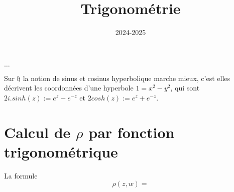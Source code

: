 \documentclass[a4paper,12pt]{article}
\title{Trigonométrie}
\date{2024-2025}
\newcommand{\h}{\mathfrak{h}}
\theoremstyle{plain}
\theoremstyle{definition}
\theoremstyle{remark}
\begin{document}
\maketitle
\tableofcontents

\begin{center}
  $\ldots$
\end{center}

Sur $\h$ la notion de sinus et cosinus hyperbolique 
marche mieux, c'est elles décrivent les coordonnées
d'une hyperbole $1=x^2-y^2$, qui sont 
$2i.sinh(z):=e^z-e^{-z}$ et $2cosh(z):=e^z+e^{-z}$.

\section{Calcul de $\rho$ par fonction trigonométrique}
La formule 
\[\rho(z,w)=\]


\end{document}

